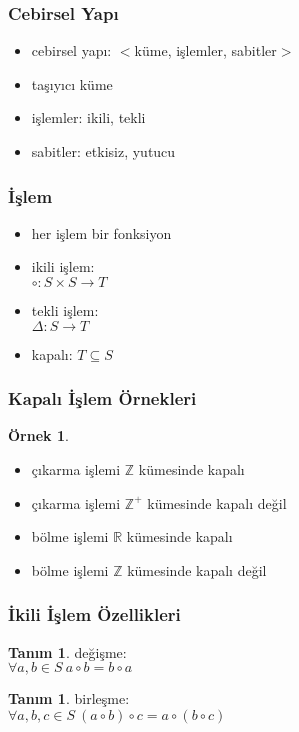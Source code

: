 \documentclass[dvipsnames]{beamer}
\theoremstyle{definition}
\newtheorem{tanim}[theorem]{Tanım}
\theoremstyle{example}
\newtheorem{ornek}[theorem]{Örnek}
\theoremstyle{plain}
\begin{document}
\begin{frame}
  \frametitle{Cebirsel Yapı}

  \begin{itemize}
    \item \alert{cebirsel yapı}: $<$küme, işlemler, sabitler$>$

    \bigskip
    \item taşıyıcı küme
    \item işlemler: ikili, tekli
    \item sabitler: etkisiz, yutucu
  \end{itemize}
\end{frame}

\begin{frame}
  \frametitle{İşlem}

  \begin{itemize}
    \item her işlem bir fonksiyon

    \medskip
    \item ikili işlem:\\
      $\circ: S \times S \rightarrow T$

    \medskip
    \item tekli işlem:\\
      $\Delta: S \rightarrow T$

    \pause
    \medskip
    \item \alert{kapalı}: $T \subseteq S$
  \end{itemize}
\end{frame}

\begin{frame}
  \frametitle{Kapalı İşlem Örnekleri}

  \begin{ornek}
    \begin{itemize}
      \item çıkarma işlemi $\mathbb{Z}$ kümesinde kapalı
      \item çıkarma işlemi $\mathbb{Z^+}$ kümesinde kapalı değil

      \pause
      \medskip
      \item bölme işlemi $\mathbb{R}$ kümesinde kapalı
      \item bölme işlemi $\mathbb{Z}$ kümesinde kapalı değil
    \end{itemize}
  \end{ornek}
\end{frame}

\begin{frame}
  \frametitle{İkili İşlem Özellikleri}

  \begin{tanim}
    \alert{değişme}:\\
    $\forall a,b \in S~a \circ b = b \circ a$
  \end{tanim}

  \begin{tanim}
    \alert{birleşme}:\\
    $\forall a,b,c \in S~(a \circ b) \circ c = a \circ (b \circ c)$
  \end{tanim}
\end{frame}
\end{document}
